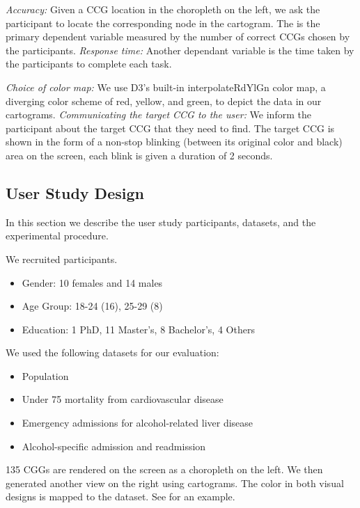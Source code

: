 \textit{Accuracy:} Given a CCG location in the choropleth on the left, we ask the participant to locate the corresponding node in the cartogram. The is the primary dependent variable measured by the number of correct CCGs chosen by the participants. \textit{Response time:} Another dependant variable is the time taken by the participants to complete each task.

\textit{Choice of color map:} We use D3's built-in interpolateRdYlGn color map, a diverging color scheme of red, yellow, and green, to depict the data in our cartograms. \textit{Communicating the target CCG to the user:} We inform the participant about the target CCG that they need to find. The target CCG is shown in the form of a non-stop blinking (between its original color and black) area on the screen, each blink is given a duration of 2 seconds.

\subsection{User Study Design}
In this section we describe the user study participants, datasets, and the experimental procedure.

 We recruited \pCount participants.

\begin{itemize}
    \item Gender: 10 females and 14 males
    \item Age Group: 18-24 (16), 25-29 (8)
    \item Education: 1 PhD, 11 Master's, 8 Bachelor's, 4 Others
\end{itemize}

 We used the following datasets for our evaluation:

\begin{itemize}
    \item Population
    \item Under 75 mortality from cardiovascular disease
    \item Emergency admissions for alcohol-related liver disease
    \item Alcohol-specific admission and readmission
\end{itemize}

135 CGGs are rendered on the screen as a choropleth on the left. We then generated another view on the right using cartograms. The color in both visual designs is mapped to the dataset. See  for an example.

